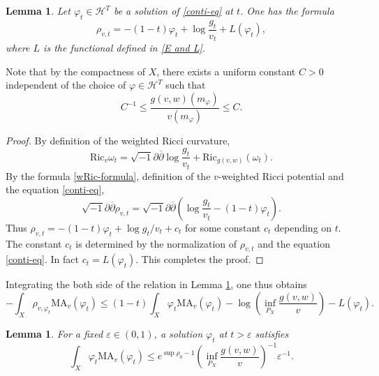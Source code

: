\documentclass[12pt]{amsart}
\numberwithin{equation}{section}%
\theoremstyle{plain}
\newtheorem{lemma}[theorem]{Lemma}
\theoremstyle{definition}
\newcommand{\deldel}{\sqrt{-1}\partial \overline{\partial}}
\newcommand{\e}{\varepsilon}
\newcommand{\Ric}{\mathrm{Ric}}
\newcommand{\MA}{\mathrm{MA}}
\renewcommand{\phi}{\varphi}
\renewcommand{\leq}{\leqslant}
\newcommand{\1}{\mathbf{1}}
\begin{document}
\begin{lemma}\label{rho-eq}
Let $\phi_{t}\in \mathcal{H}^T$ be a solution of \eqref{conti-eq} at $t$. 
One has the formula
\begin{equation}\label{rho-formula}
\rho_{v,t}=-(1-t)\phi_{t}+\log\frac{g_{t}}{v_{t}}+L(\phi_{t}),
\end{equation}
where $L$ is the functional defined in \eqref{E and L}.
\end{lemma}
Note that by the compactness of $X$,
there exists a uniform constant $C>0$ independent of
the choice of $\phi\in\mathcal{H}^{T}$ such that
\begin{equation}
C^{-1}\leq \frac{g(v,w)(m_{\phi})}{v(m_{\phi})} \leq C.
\end{equation}

\begin{proof}
By definition of the weighted Ricci curvature,
\begin{equation}\label{wRic-formula}
\Ric_{v}\omega_{t}=\deldel\log\frac{g_{t}}{v_{t}}+\Ric_{g(v,w)}(\omega_{t}).
\end{equation}
By the formula \eqref{wRic-formula}, definition of the $v$-weighted Ricci potential 
and the equation \eqref{conti-eq},
\begin{equation}
\deldel\rho_{v,t}=\deldel\left(\log\frac{g_{t}}{v_{t}}-(1-t)\phi_{t}\right).
\end{equation}
Thus $\rho_{v,t}=-(1-t)\phi_{t}+\log g_{t}/v_{t}+c_{t}$
for some constant $c_{t}$ depending on $t$.
The constant $c_{t}$ is determined by the normalization of $\rho_{v,t}$
and the equation \eqref{conti-eq}.
In fact $c_{t}=L(\phi_{t})$.
This completes the proof.
\end{proof}

Integrating the both side of the relation in Lemma \ref{rho-eq},
one thus obtains
\begin{equation}
-\int_{X}\rho_{v,\phi_{t}}\MA_{v}(\phi_{t})
\leq
(1-t)\int_{X}\phi_{t}\MA_{v}(\phi_{t}) -\log\left(\inf_{P_{X}} \frac{g(v,w)}{v}\right)-L(\phi_t).
\end{equation}

\begin{lemma}\label{int-phi}
For a fixed $\e\in (0,1)$,
a solution $\phi_{t}$ at $t>\e$ satisfies
\begin{equation}
\int_{X}\phi_{t}\MA_{v}(\phi_{t})
\leq e^{\sup\rho_{0}-1}\left(\inf_{P_{X}} \frac{g(v,w)}{v}\right)^{-1}\e^{-1}.
\end{equation}
\end{lemma}
\end{document}
